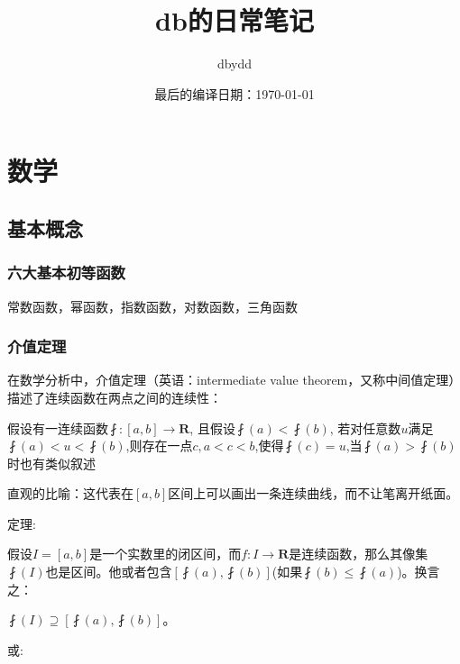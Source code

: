 \documentclass[UTF8]{ctexbook}
\title{db的日常笔记}
\date{最后的编译日期：\today}
\author{dbydd}
\begin{document}
\setcounter{page}{1}
\chapter{数学}{
\section{基本概念}{
\subsection{六大基本初等函数}{
  常数函数，幂函数，指数函数，对数函数，三角函数
}%

\subsection{介值定理}{
在数学分析中，介值定理（英语：intermediate value theorem，又称中间值定理）描述了连续函数在两点之间的连续性：

假设有一连续函数$\fint:[a,b]\rightarrow \mathbf{R}$, 且假设$\fint(a)<\fint(b)$, 若对任意数$u$满足$\fint(a)<u<\fint(b)$,则存在一点$c,a<c<b$,使得$\fint(c) = u$,当$\fint(a)>\fint(b)$时也有类似叙述

直观的比喻：这代表在$[a,b]$区间上可以画出一条连续曲线，而不让笔离开纸面。
\newline

定理:

假设$I = [a,b]$是一个实数里的闭区间，而$f:I\rightarrow\mathbf{R}$是连续函数，那么其像集$\fint(I)$也是区间。他或者包含$[\fint(a),\fint(b)]$(如果$\fint(b)\leq\fint(a)$)。换言之：

$\fint(I)\supseteq[\fint(a),\fint(b)]$。

或:

}}}
\end{document}
